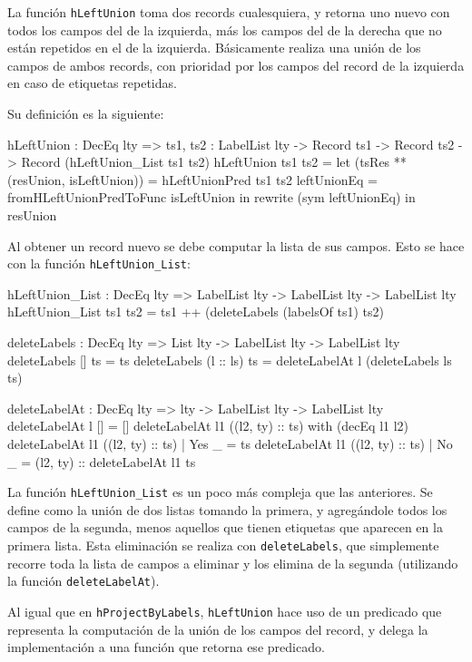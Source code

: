 La función \texttt{hLeftUnion} toma dos records cualesquiera, y retorna uno nuevo con todos los campos del de la izquierda, más los campos del de la derecha que no están repetidos en el de la izquierda. Básicamente realiza una unión de los campos de ambos records, con prioridad por los campos del record de la izquierda en caso de etiquetas repetidas.

Su definición es la siguiente:

\begin{code}
hLeftUnion : DecEq lty => {ts1, ts2 : LabelList lty} ->
  Record ts1 -> Record ts2 -> Record (hLeftUnion_List ts1 ts2)
hLeftUnion ts1 ts2 =
  let (tsRes ** (resUnion, isLeftUnion)) =
      hLeftUnionPred ts1 ts2
    leftUnionEq = fromHLeftUnionPredToFunc isLeftUnion
  in rewrite (sym leftUnionEq) in resUnion
\end{code}

Al obtener un record nuevo se debe computar la lista de sus campos. Esto se hace con la función \texttt{hLeftUnion\_List}:

\begin{code}
hLeftUnion_List : DecEq lty => LabelList lty ->
  LabelList lty -> LabelList lty
hLeftUnion_List ts1 ts2 =
  ts1 ++ (deleteLabels (labelsOf ts1) ts2)

deleteLabels : DecEq lty => List lty -> LabelList lty ->
  LabelList lty
deleteLabels [] ts = ts
deleteLabels (l :: ls) ts =
  deleteLabelAt l (deleteLabels ls ts)

deleteLabelAt : DecEq lty => lty -> LabelList lty ->
  LabelList lty
deleteLabelAt l [] = []
deleteLabelAt l1 ((l2, ty) :: ts) with (decEq l1 l2)
  deleteLabelAt l1 ((l2, ty) :: ts) | Yes _ = ts
  deleteLabelAt l1 ((l2, ty) :: ts) | No _ =
    (l2, ty) :: deleteLabelAt l1 ts
\end{code}

La función \texttt{hLeftUnion\_List} es un poco más compleja que las anteriores. Se define como la unión de dos listas tomando la primera, y agregándole todos los campos de la segunda, menos aquellos que tienen etiquetas que aparecen en la primera lista. Esta eliminación se realiza con \texttt{deleteLabels}, que simplemente recorre toda la lista de campos a eliminar y los elimina de la segunda (utilizando la función \texttt{deleteLabelAt}).

Al igual que en \texttt{hProjectByLabels}, \texttt{hLeftUnion} hace uso de un predicado que representa la computación de la unión de los campos del record, y delega la implementación a una función que retorna ese predicado.

